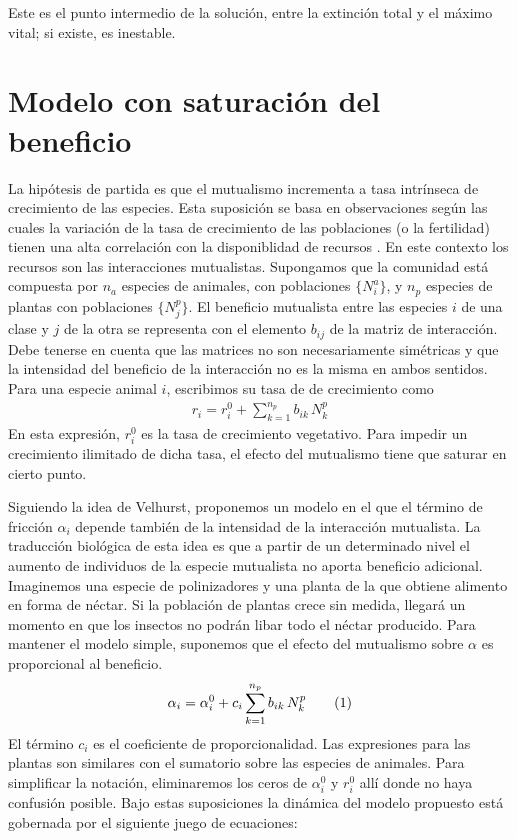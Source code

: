 Este es el punto intermedio de la solución, entre la extinción total y el máximo vital; si existe, es inestable.

\clearpage
\section{Modelo con saturación del beneficio}

La hipótesis de partida es que el mutualismo incrementa a tasa intrínseca de crecimiento de las especies. Esta suposición se basa en observaciones según las cuales la variación de la tasa de crecimiento de las poblaciones (o la fertilidad) tienen una alta correlación con la disponiblidad de recursos \cite{stenseth1998,krebs2002,rueness2003,tyler2008,jones2008}. En este contexto los recursos son las interacciones mutualistas. Supongamos que la comunidad está compuesta por $n_a$ especies de animales, con poblaciones $\{N_{i}^a\}$, y $n_p$ especies de plantas con poblaciones $\{N_{j}^p\}$. El beneficio mutualista entre las especies $i$  de una clase y $j$ de la otra se representa con el elemento $b_{ij}$ de la matriz de interacción. Debe tenerse en cuenta que las matrices no son necesariamente simétricas y que la intensidad del beneficio de la interacción no es la misma en ambos sentidos. Para una especie animal $i$, escribimos su tasa de de crecimiento como
\begin{align}
r_{i} = r_{i}^{0} + \sum_{k=1}^{n_{p}} b_{ik}\, N^{p}_k
\label{eq:expr}
\end{align}
En esta expresión, $r_{i}^{0}$ es la tasa de crecimiento vegetativo. Para impedir un crecimiento ilimitado de dicha tasa, el efecto del mutualismo tiene que saturar en cierto punto.

Siguiendo la idea de Velhurst, proponemos un modelo en el que el término de fricción $\alpha_i$ depende también de la intensidad de la interacción mutualista. La traducción biológica de esta idea es que a partir de un determinado nivel el aumento de individuos de la especie mutualista no aporta beneficio adicional. Imaginemos una especie de polinizadores y una planta de la que obtiene alimento en forma de néctar. Si la población de plantas crece sin medida, llegará un momento en que los insectos no podrán libar todo el néctar producido. Para mantener el modelo simple, suponemos que el efecto del mutualismo sobre $\alpha$ es proporcional al beneficio. 
\begin{align}
\alpha_i = \alpha_{i}^{0}+ c_{i} \sum_{k=1}^{n_{p}} b_{ik}\, N^{p}_k 
\stepcounter{equation}\tag{\theequation}
\label{eq:alphavariable}
\end{align}
El término $c_{i}$ es el coeficiente de proporcionalidad. Las expresiones para las plantas son similares con el sumatorio sobre las especies de animales. Para simplificar la notación, eliminaremos los ceros de $\alpha_{i}^{0}$ y $r_{i}^{0}$ allí donde no haya confusión posible. Bajo estas suposiciones la dinámica del modelo propuesto está gobernada por el siguiente juego de ecuaciones:

